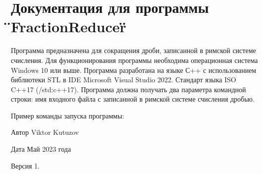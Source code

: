\chapter{Документация для программы \"{}\+Fraction\+Reducer\"{}}
\hypertarget{index}{}\label{index}
Программа предназначена для сокращения дроби, записанной в римской системе счисления. Для функционирования программы необходима операционная система Windows 10 или выше. Программа разработана на языке С++ с использованием библиотеки STL в IDE Microsoft Visual Studio 2022. Стандарт языка ISO C++17 (/std\+:c++17). Программа должна получать два параметра командной строки\+: имя входного файла с записанной в римской системе счисления дробью.

Пример команды запуска программы\+: 
\begin{DoxyCode}{0}

\end{DoxyCode}
 \begin{DoxyAuthor}{Автор}
Viktor Kutuzov 
\end{DoxyAuthor}
\begin{DoxyDate}{Дата}
Май 2023 года 
\end{DoxyDate}
\begin{DoxyVersion}{Версия}
1. 
\end{DoxyVersion}
